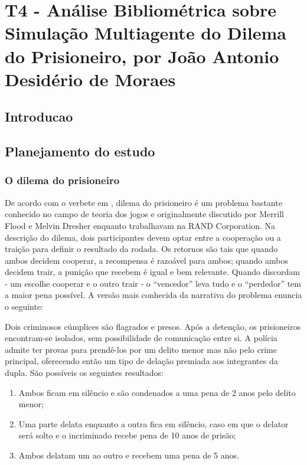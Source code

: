 \chapter{T4 - Análise Bibliométrica sobre Simulação Multiagente do Dilema do Prisioneiro, por João Antonio Desidério de Moraes \label{chap:bibliometria:joaoadm94}}

\section{Introducao}
\label{MASSA@joaoadm94:introducao}


\section{Planejamento do estudo}
\label{MASSA@joaoadm94:planejamento}
\subsection{O dilema do prisioneiro}
\label{MASSA@joaoadm94:dilemadoprisioneiro}
De acordo com o verbete em \cite{noauthor_prisoners_nodate},  dilema do prisioneiro é um problema bastante conhecido no campo de teoria dos jogos e originalmente discutido por Merrill Flood e Melvin Dresher enquanto trabalhavam na RAND Corporation. 
Na descrição do dilema, dois participantes devem optar entre a cooperação ou a traição para definir o resultado da rodada. Os retornos são tais que quando ambos decidem cooperar, a recompensa é razoável para ambos; quando ambos decidem trair, a punição que recebem é igual e bem relevante. Quando discordam - um escolhe cooperar e o outro trair - o ``vencedor'' leva tudo e o ``perdedor'' tem a maior pena possível. A versão mais conhecida da narrativa do problema enuncia o seguinte:

Dois criminosos cúmplices são flagrados e presos. Após a detenção, os prisioneiros encontram-se isolados, sem possibilidade de comunicação entre si. A polícia admite ter provas para prendê-los por um delito menor mas não pelo crime principal, oferecendo então um tipo de delação premiada aos integrantes da dupla. São possíveis os seguintes resultados:

\begin{enumerate}
\item Ambos ficam em silêncio e são condenados a uma pena de 2 anos pelo delito menor;
\item Uma parte delata enquanto a outra fica em silêncio, caso em que o delator será solto e o incriminado recebe pena de 10 anos de prisão;
\item Ambos delatam um ao outro e recebem uma pena de 5 anos. 
\end{enumerate}


